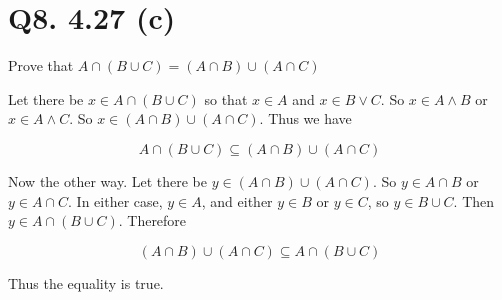 \documentclass{article}
\begin{document}
\section*{Q8. 4.27 (c)}

Prove that $A \cap (B \cup C) = (A \cap B) \cup (A \cap C)$

Let there be $x \in A \cap (B \cup C)$ so that $x \in A$ and $x \in B \vee C$. So $x \in A \wedge B$ or $x \in A \wedge C$. So $x \in (A \cap B) \cup (A \cap C)$. Thus we have 

$$A \cap (B \cup C) \subseteq (A \cap B) \cup (A \cap C)$$

Now the other way. Let there be $y \in (A \cap B) \cup (A \cap C)$. So $y \in A \cap B$ or $y \in A \cap C$. In either case, $y \in A$, and either $y \in B$ or $y \in C$, so $y \in B \cup C$. Then $y \in A \cap (B \cup C)$. Therefore

$$(A \cap B) \cup (A \cap C) \subseteq A \cap (B \cup C)$$

Thus the equality is true.
\end{document}
